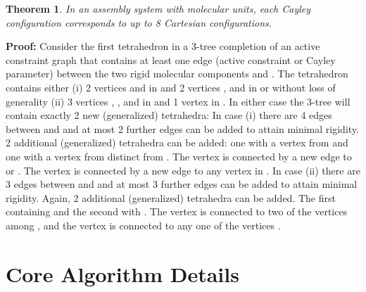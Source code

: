 \documentclass[]{article}
\newtheorem{theorem}{Theorem}[section]
\newenvironment{proof}{
    {\bf Proof:}}{\hbox{\ }\hfill \break }
\newcommand{\rmc}{rigid molecular component}
\begin{document}
\begin{theorem}
\label{thm:realization}
In an assembly system with  molecular units, each Cayley configuration
corresponds to up to 8 Cartesian configurations.
\end{theorem}
\begin{proof}
Consider the first tetrahedron in a 3-tree completion of an active constraint
graph that contains at least one edge (active constraint or Cayley parameter)
between the two \rmc s  and . The tetrahedron contains either (i) 2
vertices  and  in  and 2 vertices , and  in  
or without loss of generality (ii) 3 vertices , , and  in 
 and 1 vertex  in .  In either case the 3-tree will contain
exactly 2 new (generalized) tetrahedra: In case (i) there are 4 edges between
 and  and at most 2 further edges can be added to attain minimal rigidity.
2 additional (generalized) tetrahedra can be added: one with a vertex  
from  and one with a vertex  from  distinct from . 
The vertex  is connected by a new edge to  or .
The vertex  is connected by a new edge to any vertex in . In case (ii) there
are 3 edges between  and  and at most 3 further edges can be added to attain
minimal rigidity. Again, 2 additional (generalized) tetrahedra can be added. The first
containing  and the second with . 
The vertex  is connected to two of the vertices among ,
and the vertex  is connected to any one of the vertices .
\end{proof}

\section{Core Algorithm Details}
\label{sec:app:algorithm}
\end{document}
